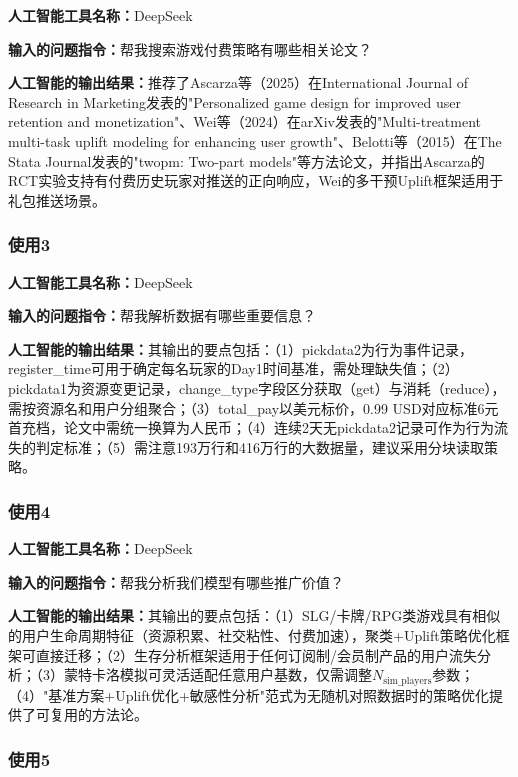 \textbf{人工智能工具名称：}DeepSeek

\textbf{输入的问题指令：}帮我搜索游戏付费策略有哪些相关论文？

\textbf{人工智能的输出结果：}推荐了Ascarza等（2025）在International Journal of Research in Marketing发表的"Personalized game design for improved user retention and monetization"、Wei等（2024）在arXiv发表的"Multi-treatment multi-task uplift modeling for enhancing user growth"、Belotti等（2015）在The Stata Journal发表的"twopm: Two-part models"等方法论文，并指出Ascarza的RCT实验支持有付费历史玩家对推送的正向响应，Wei的多干预Uplift框架适用于礼包推送场景。

\subsubsection{使用3}

\textbf{人工智能工具名称：}DeepSeek

\textbf{输入的问题指令：}帮我解析数据有哪些重要信息？

\textbf{人工智能的输出结果：}其输出的要点包括：（1）pickdata2为行为事件记录，register\_time可用于确定每名玩家的Day1时间基准，需处理缺失值；（2）pickdata1为资源变更记录，change\_type字段区分获取（get）与消耗（reduce），需按资源名和用户分组聚合；（3）total\_pay以美元标价，0.99 USD对应标准6元首充档，论文中需统一换算为人民币；（4）连续2天无pickdata2记录可作为行为流失的判定标准；（5）需注意193万行和416万行的大数据量，建议采用分块读取策略。

\subsubsection{使用4}

\textbf{人工智能工具名称：}DeepSeek

\textbf{输入的问题指令：}帮我分析我们模型有哪些推广价值？

\textbf{人工智能的输出结果：}其输出的要点包括：（1）SLG/卡牌/RPG类游戏具有相似的用户生命周期特征（资源积累、社交粘性、付费加速），聚类+Uplift策略优化框架可直接迁移；（2）生存分析框架适用于任何订阅制/会员制产品的用户流失分析；（3）蒙特卡洛模拟可灵活适配任意用户基数，仅需调整$N_{\text{sim\_players}}$参数；（4）"基准方案+Uplift优化+敏感性分析"范式为无随机对照数据时的策略优化提供了可复用的方法论。

\subsubsection{使用5}

